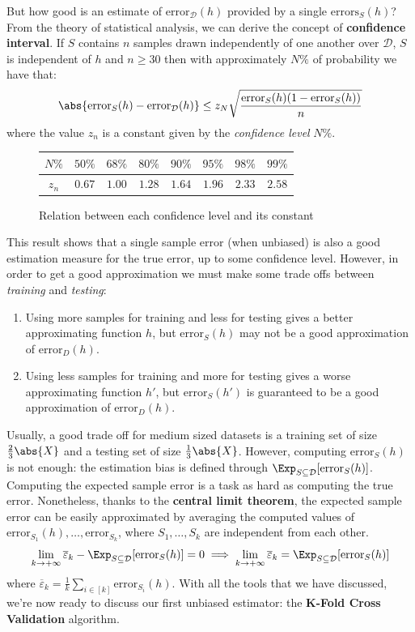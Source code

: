 \documentclass[a4paper, 12pt]{report}
\begin{document}
    But how good is an estimate of $\mathrm{error}_\mathcal{D}(h)$ provided by a single $\mathrm{errors}_S(h)$? From the theory of statistical analysis, we can derive the concept of \textbf{confidence interval}. If $S$ contains $n$ samples drawn independently of one another over $\mathcal{D}$, $S$ is independent of $h$ and $n \geq 30$ then with approximately $N\%$ of probability we have that:
    \[\abs{\mathrm{error}_{S}(h) - \mathrm{error}_\mathcal{D}(h)} \leq z_N \sqrt{ \frac{\mathrm{error}_S(h)(1- \mathrm{error}_S(h))}{n}}\]
    where the value $z_n$ is a constant given by the \textit{confidence level} $N\%$.
    \begin{figure}[H]
        \centering
        \begin{tabular}{|c|ccccccc|}
            \hline
            $N\%$ & $50\%$ & $68\%$ & $80\%$ & $90\%$ & $95\%$ & $98\%$ & $99\%$ \\
            \hline
            $z_n$ & $0.67$ & $1.00$ & $1.28$ & $1.64$ & $1.96$ & $2.33$ & $2.58$ \\
            \hline
        \end{tabular}
        \caption{Relation between each confidence level and its constant}
    \end{figure}

    This result shows that a single sample error (when unbiased) is also a good estimation measure for the true error, up to some confidence level. However, in order to get a good approximation we must make some trade offs between \textit{training} and \textit{testing}:
    \begin{enumerate}
        \item Using more samples for training and less for testing gives a better approximating function $h$, but $\mathrm{error}_S(h)$ may not be a good approximation of $\mathrm{error}_D(h)$. 
        \item Using less samples for training and more for testing gives a worse approximating function $h'$, but $\mathrm{error}_S(h')$ is guaranteed to be a good approximation of $\mathrm{error}_D(h)$. 
    \end{enumerate}

    Usually, a good trade off for medium sized datasets is a training set of size $\frac{2}{3}\abs{X}$ and a testing set of size $\frac{1}{3}\abs{X}$. However, computing $\mathrm{error}_S(h)$ is not enough: the estimation bias is defined through $\Exp_{S \subseteq\mathcal{D}} [\mathrm{error}_S(h)]$. Computing the expected sample error is a task as hard as computing the true error. Nonetheless, thanks to the \textbf{central limit theorem}, the expected sample error can be easily approximated by averaging the computed values of $\mathrm{error}_{S_1}(h), \ldots, \mathrm{error}_{S_k}$, where $S_1, \ldots, S_k$ are independent from each other.
    \[\lim_{k \to +\infty} \overline{\varepsilon}_k - \Exp_{S \subseteq\mathcal{D}} [\mathrm{error}_S(h)] = 0 \implies \lim_{k \to +\infty} \overline{\varepsilon}_k = \Exp_{S \subseteq\mathcal{D}} [\mathrm{error}_S(h)]\]
    where $\overline{\varepsilon}_k = \frac{1}{k} \sum_{i \in [k]} \mathrm{error}_{S_i}(h)$. With all the tools that we have discussed, we're now ready to discuss our first unbiased estimator: the \textbf{K-Fold Cross Validation} algorithm.
\end{document}
